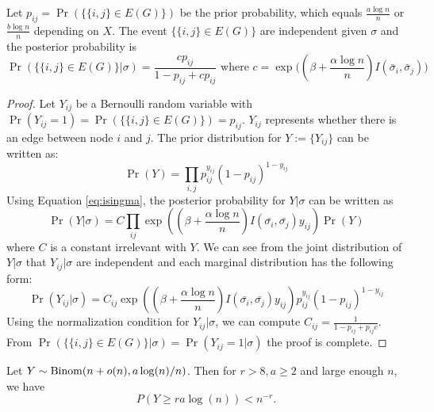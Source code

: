 \documentclass{article}
\begin{document}
\begin{lemma}\label{lem:post_independent}
	Let $p_{ij}=\Pr(\{\{i,j\} \in E(G) \})$ be the prior probability, which equals $\frac{a\log n}{n}$ or $\frac{b\log n}{n}$ depending on $X$.
	The event $\{\{i,j\} \in E(G) \}$ are independent given $\sigma$ and the posterior probability is
	\begin{equation}
	\Pr(\{\{i,j\} \in E(G) \} | \sigma) = \frac{c p_{ij} }{1-p_{ij} + cp_{ij}} \text{ where  } c= \exp\Big((\beta + \frac{\alpha \log n}{n} ) I(\bar{\sigma}_i, \bar{\sigma}_j) \Big)
	\end{equation}
\end{lemma}
\begin{proof}
	Let $Y_{ij}$ be a Bernoulli random variable with $\Pr(Y_{ij} = 1) = \Pr(\{\{i,j\} \in E(G)\}) = p_{ij}$. $Y_{ij}$ represents whether there is an edge between node $i$ and $j$.
	The prior distribution for $Y:=\{Y_{ij}\}$ can be written as:
	$$
	\Pr(Y) = \prod_{i,j} p_{ij}^{y_{ij}} (1-p_{ij})^{1-y_{ij}}
	$$ 
	Using Equation \eqref{eq:isingma}, the posterior probability for $Y| \sigma$ can be written as
	$$
	\Pr(Y|\sigma) = C\prod_{ij} \exp((\beta + \frac{\alpha \log n}{n})I(\bar{\sigma_i}, \bar{\sigma_j} )y_{ij}) \Pr(Y)
	$$
	where $C$ is a constant irrelevant with $Y$.
	We can see from the joint distribution of $Y|\sigma$ that $Y_{ij} | \sigma$ are independent and each marginal distribution has the following form:
	$$
	\Pr(Y_{ij} | \sigma) = C_{ij} \exp((\beta + \frac{\alpha \log n}{n})I(\bar{\sigma_i}, \bar{\sigma_j} )y_{ij}) p_{ij}^{y_{ij}} (1-p_{ij})^{1-y_{ij}}
	$$
	Using the normalization condition for $Y_{ij} | \sigma $, we can compute $C_{ij} = \frac{1}{1-p_{ij} + p_{ij}c}$. From $\Pr(\{\{i,j\} \in E(G) \} | \sigma) =\Pr(Y_{ij}=1|\sigma)$ the proof is complete.
\end{proof}


\begin{lemma} \label{lm:bmd}
	Let $Y\sim \operatorname{Binom}(n + o(n), a\log(n)/n)$. Then for $r>8, a \geq 2$ and large enough $n$, we have
	$$
	P(Y\ge r a \log(n)) < n^{-r} .
	$$
\end{lemma}




\end{document}
